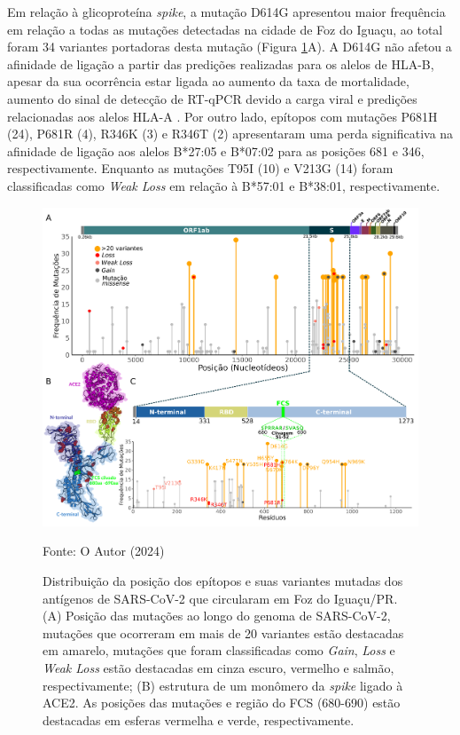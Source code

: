 \begin{justifying}
Em relação à glicoproteína \textit{spike}, a mutação D614G apresentou maior frequência em relação a todas as mutações detectadas na cidade de Foz do Iguaçu, ao total foram 34 variantes portadoras desta mutação (Figura \ref{fig:fig9}A). A D614G não afetou a afinidade de ligação a partir das predições realizadas para os alelos de HLA-B, apesar da sua ocorrência estar ligada ao aumento da taxa de mortalidade, aumento do sinal de detecção de RT-qPCR devido a carga viral e predições relacionadas aos alelos HLA-A \cite{Hamelin:2022, Korber:2020, Toyoshima:2020}. Por outro lado, epítopos com mutações P681H (24), P681R (4), R346K (3) e R346T (2) apresentaram uma perda significativa na afinidade de ligação aos alelos  B*27:05 e B*07:02 para as posições 681 e 346, respectivamente. Enquanto as mutações T95I (10) e V213G (14) foram classificadas como \textit{Weak Loss} em relação à  B*57:01 e B*38:01, respectivamente.  


\begin{figure}
    \centering
    \caption{\justifying Distribuição da posição dos epítopos e suas variantes mutadas dos antígenos de SARS-CoV-2 que circularam em Foz do Iguaçu/PR. (A) Posição das mutações ao longo do genoma de SARS-CoV-2, mutações que ocorreram em mais de 20 variantes estão destacadas em amarelo, mutações que foram classificadas como \textit{Gain}, \textit{Loss} e \textit{Weak Loss} estão destacadas em cinza escuro, vermelho e salmão, respectivamente; (B) estrutura de um monômero da \textit{spike} ligado à ACE2. As posições das mutações e região do FCS (680-690) estão destacadas em esferas vermelha e verde, respectivamente. 
}
    \includegraphics[width=1\textwidth, height=0.8\textwidth]{Figuras/fig9.png}
    \label{fig:fig9}
    \begin{minipage}{0.8\textwidth} %
        \centering
        \footnotesize Fonte: O Autor (2024)
    \end{minipage}
\end{figure}


\end{justifying}

